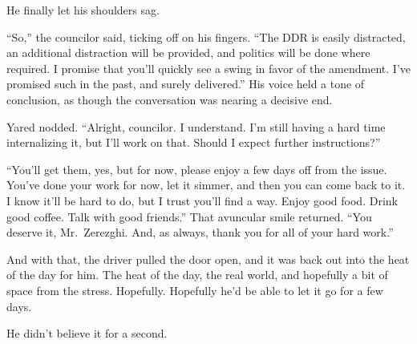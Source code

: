 He finally let his shoulders sag.

``So,'' the councilor said, ticking off on his fingers. ``The DDR is easily distracted, an additional distraction will be provided, and politics will be done where required. I promise that you'll quickly see a swing in favor of the amendment. I've promised such in the past, and surely delivered.'' His voice held a tone of conclusion, as though the conversation was nearing a decisive end.

Yared nodded. ``Alright, councilor. I understand. I'm still having a hard time internalizing it, but I'll work on that. Should I expect further instructions?''

``You'll get them, yes, but for now, please enjoy a few days off from the issue. You've done your work for now, let it simmer, and then you can come back to it. I know it'll be hard to do, but I trust you'll find a way. Enjoy good food. Drink good coffee. Talk with good friends.'' That avuncular smile returned. ``You deserve it, Mr.~Zerezghi. And, as always, thank you for all of your hard work.''

And with that, the driver pulled the door open, and it was back out into the heat of the day for him. The heat of the day, the real world, and hopefully a bit of space from the stress. Hopefully. Hopefully he'd be able to let it go for a few days.

He didn't believe it for a second.
